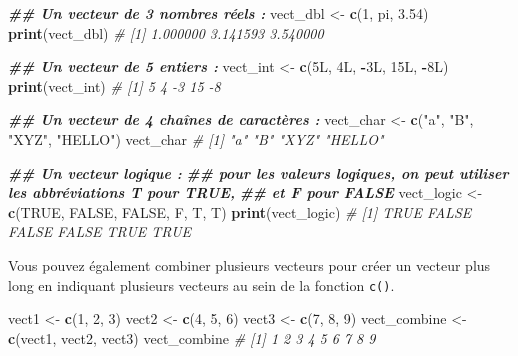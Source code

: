 \documentclass[
]{book}
\newenvironment{Shaded}{\begin{snugshade}}{\end{snugshade}}
\newcommand{\CommentTok}[1]{\textcolor[rgb]{0.56,0.35,0.01}{\textit{#1}}}
\newcommand{\ConstantTok}[1]{\textcolor[rgb]{0.56,0.35,0.01}{#1}}
\newcommand{\DataTypeTok}[1]{\textcolor[rgb]{0.13,0.29,0.53}{#1}}
\newcommand{\DecValTok}[1]{\textcolor[rgb]{0.00,0.00,0.81}{#1}}
\newcommand{\DocumentationTok}[1]{\textcolor[rgb]{0.56,0.35,0.01}{\textbf{\textit{#1}}}}
\newcommand{\FloatTok}[1]{\textcolor[rgb]{0.00,0.00,0.81}{#1}}
\newcommand{\FunctionTok}[1]{\textcolor[rgb]{0.13,0.29,0.53}{\textbf{#1}}}
\newcommand{\NormalTok}[1]{#1}
\newcommand{\OtherTok}[1]{\textcolor[rgb]{0.56,0.35,0.01}{#1}}
\newcommand{\SpecialCharTok}[1]{\textcolor[rgb]{0.81,0.36,0.00}{\textbf{#1}}}
\newcommand{\StringTok}[1]{\textcolor[rgb]{0.31,0.60,0.02}{#1}}
\begin{document}
\begin{Shaded}
\begin{Highlighting}[]
\DocumentationTok{\#\# Un vecteur de 3 nombres réels :}
\NormalTok{vect\_dbl }\OtherTok{\textless{}{-}} \FunctionTok{c}\NormalTok{(}\DecValTok{1}\NormalTok{, pi, }\FloatTok{3.54}\NormalTok{)}
\FunctionTok{print}\NormalTok{(vect\_dbl) }\CommentTok{\# [1] 1.000000 3.141593 3.540000}

\DocumentationTok{\#\# Un vecteur de 5 entiers :}
\NormalTok{vect\_int }\OtherTok{\textless{}{-}} \FunctionTok{c}\NormalTok{(}\DecValTok{5}\DataTypeTok{L}\NormalTok{, }\DecValTok{4}\DataTypeTok{L}\NormalTok{, }\SpecialCharTok{{-}}\DecValTok{3}\DataTypeTok{L}\NormalTok{, }\DecValTok{15}\DataTypeTok{L}\NormalTok{, }\SpecialCharTok{{-}}\DecValTok{8}\DataTypeTok{L}\NormalTok{) }
\FunctionTok{print}\NormalTok{(vect\_int) }\CommentTok{\# [1]  5  4 {-}3 15 {-}8}

\DocumentationTok{\#\# Un vecteur de 4 chaînes de caractères :}
\NormalTok{vect\_char }\OtherTok{\textless{}{-}} \FunctionTok{c}\NormalTok{(}\StringTok{"a"}\NormalTok{, }\StringTok{"B"}\NormalTok{, }\StringTok{"XYZ"}\NormalTok{, }\StringTok{"HELLO"}\NormalTok{)}
\NormalTok{vect\_char }\CommentTok{\# [1] "a"     "B"     "XYZ"   "HELLO" }

\DocumentationTok{\#\# Un vecteur logique :}
\DocumentationTok{\#\# pour les valeurs logiques, on peut utiliser les abbréviations T pour TRUE,  }
\DocumentationTok{\#\# et F pour FALSE}
\NormalTok{vect\_logic }\OtherTok{\textless{}{-}} \FunctionTok{c}\NormalTok{(}\ConstantTok{TRUE}\NormalTok{, }\ConstantTok{FALSE}\NormalTok{, }\ConstantTok{FALSE}\NormalTok{, F, T, T)}
\FunctionTok{print}\NormalTok{(vect\_logic) }\CommentTok{\# [1]  TRUE FALSE FALSE FALSE  TRUE  TRUE}
\end{Highlighting}
\end{Shaded}

Vous pouvez également combiner plusieurs vecteurs pour créer un vecteur plus long en indiquant plusieurs vecteurs au sein de la fonction \texttt{c()}.

\begin{Shaded}
\begin{Highlighting}[]
\NormalTok{vect1 }\OtherTok{\textless{}{-}} \FunctionTok{c}\NormalTok{(}\DecValTok{1}\NormalTok{, }\DecValTok{2}\NormalTok{, }\DecValTok{3}\NormalTok{)}
\NormalTok{vect2 }\OtherTok{\textless{}{-}} \FunctionTok{c}\NormalTok{(}\DecValTok{4}\NormalTok{, }\DecValTok{5}\NormalTok{, }\DecValTok{6}\NormalTok{)}
\NormalTok{vect3 }\OtherTok{\textless{}{-}} \FunctionTok{c}\NormalTok{(}\DecValTok{7}\NormalTok{, }\DecValTok{8}\NormalTok{, }\DecValTok{9}\NormalTok{)}
\NormalTok{vect\_combine }\OtherTok{\textless{}{-}} \FunctionTok{c}\NormalTok{(vect1, vect2, vect3)}
\NormalTok{vect\_combine}
\CommentTok{\# [1] 1 2 3 4 5 6 7 8 9}
\end{Highlighting}
\end{Shaded}
\end{document}
